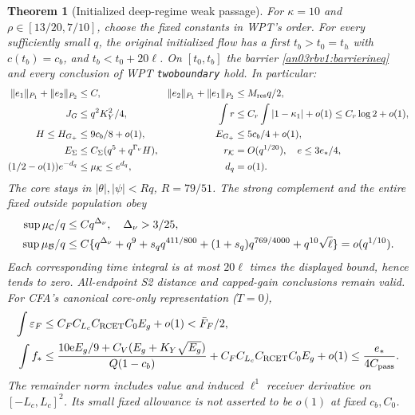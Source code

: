 \documentclass[11pt]{article}
\numberwithin{equation}{section}
\newtheorem{theorem}{Theorem}[section]
\theoremstyle{remark}\newtheorem{remark}[theorem]{Remark}
\newcommand{\KK}{\mathcal K}
\newcommand{\BB}{\mathcal B}
\newcommand{\Gp}{G_+}
\newcommand{\eps}{\varepsilon}
\begin{document}
\begin{theorem}[Initialized deep-regime weak passage]
\label{an03rbv1:completed}
For $\kappa=10$ and $\rho\in[13/20,7/10]$, choose the fixed
constants in WPT's order. For every sufficiently small $q$, the
original initialized flow has a first $t_b>t_0=t_h$ with $c(t_b)=c_b$,
and $t_b<t_0+20\ell$. On $[t_0,t_b]$ the barrier
\eqref{an03rbv1:barrierineq} and every conclusion of WPT
\texttt{twoboundary} hold. In particular:
\begin{align}
 \|e_1\|_{P_1}+\|e_2\|_{P_2}&\le C,&
 \|e_2\|_{P_1}+\|e_1\|_{P_2}&\le M_{\rm res}q/2,\notag\\
 J_G&\le q^2K_Y^2/4,&
 \int r&\le C_r\int|1-\kappa_1|+o(1)
                       \le C_r\log2+o(1),\notag\\
 H\le H_{\Gp}&\le9c_b/8+o(1),&
 E_{\Gp}&\le5c_b/4+o(1),\notag\\
 E_\Sigma&\le C_\Sigma(q^5+q^{\Gamma_\nu}H),&
 r_{\KK}&=O(q^{1/20}),\quad e\le3e_*/4,\notag\\
 (1/2-o(1))e^{-d_q}&\le\mu_{\KK}\le e^{d_q},& d_q&=o(1).
 \label{an03rbv1:conclusions}
\end{align}
The core stays in $|\theta|,|\psi|<Rq$, $R=79/51$.
The strong complement and the entire fixed outside population obey
\begin{align}
 \sup\mu_{\mathcal C}/q&\le Cq^{\Delta_\nu},\quad \Delta_\nu>3/25,
 \notag\\
 \sup\mu_{\BB}/q&\le C\{q^{\Delta_\nu}+q^9+s_qq^{411/800}
       +(1+s_q)q^{769/4000}+q^{10}\sqrt\ell\}=o(q^{1/10}).
 \label{an03rbv1:massconclusions}
\end{align}
Each corresponding time integral is at most $20\ell$ times the
displayed bound, hence tends to zero. All-endpoint S2 distance and
capped-gain conclusions remain valid. For CFA's canonical
core-only representation ($T=0$),
\begin{align}
 \int\eps_F&\le C_FC_{L_c}C_{\rm RCET}C_0E_g+o(1)<\bar F_F/2,
 \notag\\
 \int f_*&\le
 \frac{10\mathrm e E_g/9+C_V(E_g+K_Y\sqrt{E_g})}{Q(1-c_b)}
       +C_FC_{L_c}C_{\rm RCET}C_0E_g+o(1)
       \le\frac{e_*}{4C_{\rm pass}}.
 \label{an03rbv1:forcingconclusions}
\end{align}
The remainder norm includes value and induced $\ell^1$ receiver
derivative on $[-L_c,L_c]^2$. Its small fixed allowance is not
asserted to be $o(1)$ at fixed $c_b,C_0$.


\end{theorem}
\end{document}

